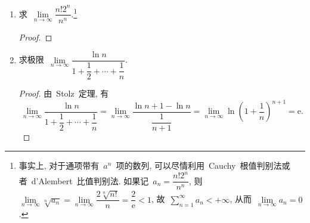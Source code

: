 \documentclass[UTF8,a4paper,10pt,twoside]{book}
\newcommand{\e}{\mathrm e}
\begin{document}
\begin{enumerate}
\begin{proof}
		      由于~$\lim\limits_{n\to\infty} \left(1+\dfrac{1}{n+1}\right)^n=\lim\limits_{n\to\infty} \left(1+\dfrac{1}{n}\right)^{n+1}=\e$, 即对于任意给定的~$\varepsilon>0$, 存在~$N\in\mathbf{N}_{+}$, 使得当~$n>N$~时有
		      \[
			      \left|\left(1+\dfrac{1}{n+1}\right)^n-\e\right|<\varepsilon \ \text{且}\ \left|\left(1+\dfrac{1}{n}\right)^{n+1}-\e\right|<\varepsilon.
		      \]
		      特别地, 当~$n>N$~时有
		      \[
			      \left(1+\dfrac{1}{n+1}\right)^n>\e-\varepsilon \ \text{且}\ \left(1+\dfrac{1}{n}\right)^{n+1}<\e+\varepsilon.
		      \]
		      由于~$\lim\limits_{n\to\infty} p_n=+\infty$, 对于~$N>0$, 存在~$M\in\mathbf{N}_{+}$~使得~$n>M$~时, $[p_n]>N$, 于是当~$n>M$~时, 就有
		      \[
			      \e-\varepsilon<\left(1+\dfrac{1}{[p_n]+1}\right)^{[p_n]}<\left(1+\dfrac{1}{p_n}\right)^{p_n}<\left(1+\dfrac{1}{[p_n]}\right)^{[p_n]+1}<\e+\varepsilon.
		      \]
		      即当~$n>M$~时~$\left|\left(1+\dfrac{1}{p_n}\right)^{p_n}-e\right|<\varepsilon$, 所以~$\lim\limits_{n\to\infty} \left(1+\dfrac{1}{p_n}\right)^{p_n}=\e$. \qedhere
	      \end{proof}
	\item 求~$\lim\limits_{n\to\infty} \dfrac{n!2^n}{n^n}$.\footnote{事实上, 对于通项带有~$a^n$~项的数列, 可以尽情利用~Cauchy~根值判别法或者~d'Alembert~比值判别法. 如果记~$a_n=\dfrac{n!2^n}{n^n}$, 则~$\lim\limits_{n\to\infty} \sqrt[n]{a_n}=\lim\limits_{n\to\infty} \dfrac{2\sqrt[n]{n!}}{n}=\dfrac{2}{\e}<1$, 故~$\sum\limits_{n=1}^{\infty}a_n<+\infty$, 从而~$\lim\limits_{n\to\infty} a_n=0$.}
	      \begin{proof}

	      \end{proof}
	\item 求极限~$\lim\limits_{n\to\infty} \dfrac{\ln{n}}{1+\dfrac{1}{2}+\cdots+\dfrac{1}{n}}$.
	      \begin{proof}
		      由~Stolz~定理, 有
		      \[
			      \lim\limits_{n\to\infty} \dfrac{\ln{n}}{1+\dfrac{1}{2}+\cdots+\dfrac{1}{n}}=\lim\limits_{n\to\infty} \dfrac{\ln{n+1}-\ln{n}}{\dfrac{1}{n+1}}=\lim\limits_{n\to\infty} \ln\left(1+\dfrac{1}{n}\right)^{n+1}=\e.
		      \]
	      \end{proof}


\end{enumerate}
\end{document}
